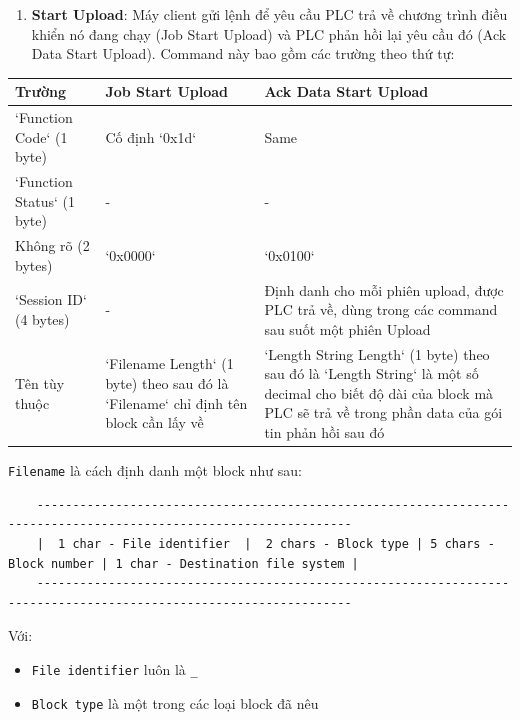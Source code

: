\documentclass[../main.tex]{subfiles}
\begin{document}
\begin{enumerate}
    \item \textbf{Start Upload}: Máy client gửi lệnh để yêu cầu PLC trả về chương trình điều khiển nó đang chạy (Job Start Upload) và PLC phản hồi lại yêu cầu đó (Ack Data Start Upload). Command này bao gồm các trường theo thứ tự:
\end{enumerate}


\begin{table}[H]
    \centering
    \footnotesize
    \begin{tabular}{|l|l|l|}
        \hline
        \textbf{Trường} & \textbf{Job Start Upload} & \textbf{Ack Data Start Upload} \\
        \hline
        `Function Code` (1 byte) & Cố định `0x1d` & Same \\
        \hline
        `Function Status` (1 byte) & - & - \\
        \hline
        Không rõ (2 bytes) & `0x0000` & `0x0100` \\
        \hline
        `Session ID` (4 bytes) & - & Định danh cho mỗi phiên upload, được PLC trả về, dùng trong các command sau suốt một phiên Upload \\
        \hline
        Tên tùy thuộc & `Filename Length` (1 byte) theo sau đó là `Filename` chỉ định tên block cần lấy về & `Length String Length` (1 byte) theo sau đó là `Length String` là một số decimal cho biết độ dài của block mà PLC sẽ trả về trong phần data của gói tin phản hồi sau đó \\
        \hline
    \end{tabular}
\end{table}


    \texttt{Filename} là cách định danh một block như sau:


\begin{verbatim}
    ------------------------------------------------------------------------------------------------------------------
    |  1 char - File identifier  |  2 chars - Block type | 5 chars - Block number | 1 char - Destination file system |
    ------------------------------------------------------------------------------------------------------------------
\end{verbatim}


    Với:


\begin{itemize}
    \item \texttt{File identifier} luôn là \texttt{\_}
    \item \texttt{Block type} là một trong các loại block đã nêu
\end{itemize}
\end{document}
